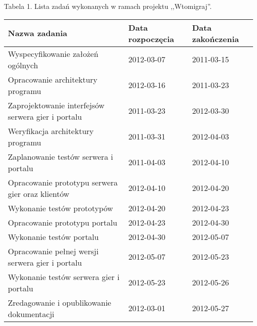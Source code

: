 \documentclass[11pt,leqno]{article}
\begin{document}

\newpage

\begin{landscape}
{\small Tabela 1. Lista zadań wykonanych w ramach projektu ,,Wtomigraj''.}
\\[0.3cm]
\begin{tabular}{|p{10cm}|l|l|}
\hline
\bf{Nazwa zadania} & \bf{Data rozpoczęcia} & \bf{Data zakończenia} \\ \hline
Wyspecyfikowanie założeń ogólnych                         & 2012-03-07 & 2011-03-15 \\ \hline
Opracowanie architektury programu                         & 2012-03-16 & 2011-03-23 \\ \hline
Zaprojektowanie interfejsów serwera gier i portalu        & 2011-03-23 & 2012-03-30 \\ \hline
Weryfikacja architektury programu                         & 2011-03-31 & 2012-04-03 \\ \hline
Zaplanowanie testów serwera i portalu                     & 2011-04-03 & 2012-04-10 \\ \hline
Opracowanie prototypu serwera gier oraz klientów          & 2012-04-10 & 2012-04-20 \\ \hline
Wykonanie testów prototypów                               & 2012-04-20 & 2012-04-23 \\ \hline
Opracowanie prototypu portalu                             & 2012-04-23 & 2012-04-30 \\ \hline
Wykonanie testów portalu                                  & 2012-04-30 & 2012-05-07 \\ \hline
Opracowanie pełnej wersji serwera gier i portalu          & 2012-05-07 & 2012-05-23 \\ \hline
Wykonanie testów serwera gier i portalu                   & 2012-05-23 & 2012-05-26 \\ \hline
Zredagowanie i opublikowanie dokumentacji                 & 2012-03-01 & 2012-05-27 \\ \hline
\end{tabular}


\end{landscape}
\end{document}
